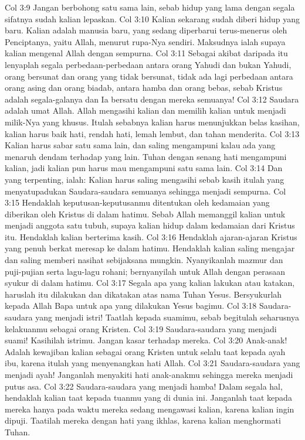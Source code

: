 Col 3:9  Jangan berbohong satu sama lain, sebab hidup yang lama dengan segala sifatnya sudah kalian lepaskan.
Col 3:10  Kalian sekarang sudah diberi hidup yang baru. Kalian adalah manusia baru, yang sedang diperbarui terus-menerus oleh Penciptanya, yaitu Allah, menurut rupa-Nya sendiri. Maksudnya ialah supaya kalian mengenal Allah dengan sempurna.
Col 3:11  Sebagai akibat daripada itu lenyaplah segala perbedaan-perbedaan antara orang Yahudi dan bukan Yahudi, orang bersunat dan orang yang tidak bersunat, tidak ada lagi perbedaan antara orang asing dan orang biadab, antara hamba dan orang bebas, sebab Kristus adalah segala-galanya dan Ia bersatu dengan mereka semuanya!
Col 3:12  Saudara adalah umat Allah. Allah mengasihi kalian dan memilih kalian untuk menjadi milik-Nya yang khusus. Itulah sebabnya kalian harus menunjukkan belas kasihan, kalian harus baik hati, rendah hati, lemah lembut, dan tahan menderita.
Col 3:13  Kalian harus sabar satu sama lain, dan saling mengampuni kalau ada yang menaruh dendam terhadap yang lain. Tuhan dengan senang hati mengampuni kalian, jadi kalian pun harus mau mengampuni satu sama lain.
Col 3:14  Dan yang terpenting, ialah: Kalian harus saling mengasihi sebab kasih itulah yang menyatupadukan Saudara-saudara semuanya sehingga menjadi sempurna.
Col 3:15  Hendaklah keputusan-keputusanmu ditentukan oleh kedamaian yang diberikan oleh Kristus di dalam hatimu. Sebab Allah memanggil kalian untuk menjadi anggota satu tubuh, supaya kalian hidup dalam kedamaian dari Kristus itu. Hendaklah kalian berterima kasih.
Col 3:16  Hendaklah ajaran-ajaran Kristus yang penuh berkat meresap ke dalam hatimu. Hendaklah kalian saling mengajar dan saling memberi nasihat sebijaksana mungkin. Nyanyikanlah mazmur dan puji-pujian serta lagu-lagu rohani; bernyanyilah untuk Allah dengan perasaan syukur di dalam hatimu.
Col 3:17  Segala apa yang kalian lakukan atau katakan, haruslah itu dilakukan dan dikatakan atas nama Tuhan Yesus. Bersyukurlah kepada Allah Bapa untuk apa yang dilakukan Yesus bagimu.
Col 3:18  Saudara-saudara yang menjadi istri! Taatlah kepada suamimu, sebab begitulah seharusnya kelakuanmu sebagai orang Kristen.
Col 3:19  Saudara-saudara yang menjadi suami! Kasihilah istrimu. Jangan kasar terhadap mereka.
Col 3:20  Anak-anak! Adalah kewajiban kalian sebagai orang Kristen untuk selalu taat kepada ayah ibu, karena itulah yang menyenangkan hati Allah.
Col 3:21  Saudara-saudara yang menjadi ayah! Janganlah menyakiti hati anak-anakmu sehingga mereka menjadi putus asa.
Col 3:22  Saudara-saudara yang menjadi hamba! Dalam segala hal, hendaklah kalian taat kepada tuanmu yang di dunia ini. Janganlah taat kepada mereka hanya pada waktu mereka sedang mengawasi kalian, karena kalian ingin dipuji. Taatilah mereka dengan hati yang ikhlas, karena kalian menghormati Tuhan.
